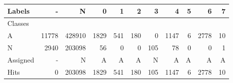 \begin{tabular}{l|r|r|r|r|r|r|r|r|r|r}

Labels &      - &       N &     0 &    1 &    2 &    3 &     4 &  5 &     6 &   7 \\\hline
Classes  &        &         &       &      &      &      &       &    &       &     \\\hline
\hline
A        &  11778 &  428910 &  1829 &  541 &  180 &    0 &  1147 &  6 &  2778 &  10 \\\hline
N        &   2940 &  203098 &    56 &    0 &    0 &  105 &    78 &  0 &     0 &   1 \\\hline
\hline
Assigned &      - &       N &     A &    A &    A &    N &     A &  A &     A &   A \\\hline
Hits     &      0 &  203098 &  1829 &  541 &  180 &  105 &  1147 &  6 &  2778 &  10 
\end{tabular}
